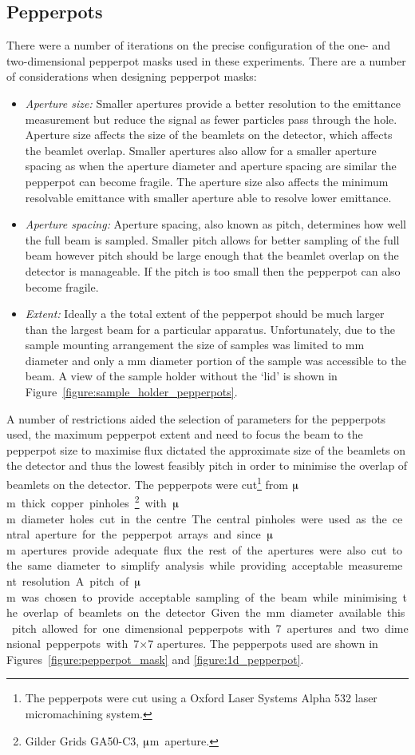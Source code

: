 \subsection{Pepperpots}
There were a number of iterations on the precise configuration of the one- and two-dimensional pepperpot masks used in these experiments.
There are a number of considerations when designing pepperpot masks:
\begin{itemize}
    \item{\emph{Aperture size:} Smaller apertures provide a better resolution to the emittance measurement but reduce the signal as fewer particles pass through the hole.
    Aperture size affects the size of the beamlets on the detector, which affects the beamlet overlap. Smaller apertures also allow for a smaller aperture spacing as when the aperture diameter and aperture spacing are similar the pepperpot can become fragile. The aperture size also affects the minimum resolvable emittance with smaller aperture able to resolve lower emittance.}
    \item{\emph{Aperture spacing:} Aperture spacing, also known as pitch, determines how well the full beam is sampled.
    Smaller pitch allows for better sampling of the full beam however pitch should be large enough that the beamlet overlap on the detector is manageable.
    If the pitch is too small then the pepperpot can also become fragile.}
    \item{\emph{Extent:} Ideally a the total extent of the pepperpot should be much larger than the largest beam for a particular apparatus.
    Unfortunately, due to the sample mounting arrangement the size of samples was limited to \unit[3]{mm} diameter and only a \unit[2]{mm} diameter portion of the sample was accessible to the beam. A view of the sample holder without the `lid' is shown in Figure~\ref{figure:sample_holder_pepperpots}.}
\end{itemize}

A number of restrictions aided the selection of parameters for the pepperpots used, the maximum pepperpot extent and need to focus the beam to the pepperpot size to maximise flux dictated the approximate size of the beamlets on the detector and thus the lowest feasibly pitch in order to minimise the overlap of beamlets on the detector.
The pepperpots were cut\footnote{The pepperpots were cut using a Oxford Laser Systems Alpha 532 laser micromachining system.} from \unit[25]{$\muup$m} thick copper pinholes\footnote{Gilder Grids GA50-C3, \unit[50]{$\muup$m} aperture.} with \unit[50]{$\muup$m} diameter holes cut in the centre.
The central pinholes were used as the central aperture for the pepperpot arrays and since \unit[50]{$\muup$m} apertures provide adequate flux the rest of the apertures were also cut to the same diameter to simplify analysis while providing acceptable measurement resolution.
A pitch of \unit[200]{$\muup$m} was chosen to provide acceptable sampling of the beam while minimising the overlap of beamlets on the detector.
Given the \unit[2]{mm} diameter available this pitch allowed for one dimensional pepperpots with 7 apertures and two dimensional pepperpots with 7$\times$7 apertures.
The pepperpots used are shown in Figures~\ref{figure:pepperpot_mask} and \ref{figure:1d_pepperpot}.

